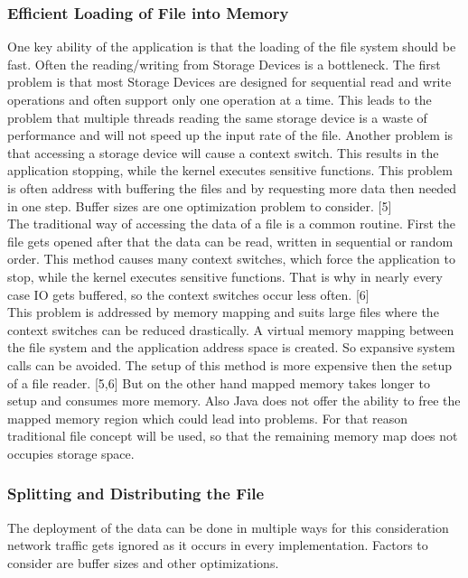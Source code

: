 \subsubsection{Efficient Loading of File into Memory}
One key ability of the application is that the loading of the file system should be fast. Often the reading/writing from Storage Devices is a bottleneck. The first problem is that most Storage Devices are designed for sequential read and write operations and often support only one operation at a time. This leads to the problem that multiple threads reading the same storage device is a waste of performance and will not speed up the input rate of the file. Another problem is that accessing a storage device will cause a context switch. This results in the application stopping, while the kernel executes sensitive functions. This problem is often address with buffering the files and by requesting more data then needed in one step. Buffer sizes are one optimization problem to consider. [5]\\
The traditional way of accessing the data of a file is a common routine. First the file gets opened after that the data can be read, written in sequential or random order. This method causes many context switches, which force the application to stop, while the kernel executes sensitive functions. That is why in nearly every case IO gets buffered, so the context switches occur less often. [6]\\
This problem is addressed by memory mapping and suits large files where the context switches can be reduced drastically. A virtual memory mapping between the file system and the application address space is created. So expansive system calls can be avoided. The setup of this method is more expensive then the setup of a file reader. [5,6] But on the other hand mapped memory takes longer to setup and consumes more memory. Also Java does not offer the ability to free the mapped memory region which could lead into problems. For that reason traditional file concept will be used, so that the remaining memory map does not occupies storage space.

\subsubsection{Splitting and Distributing the File}
The deployment of the data can be done in multiple ways for this consideration network traffic gets ignored as it occurs in every implementation. Factors to consider are buffer sizes and other optimizations.\\

